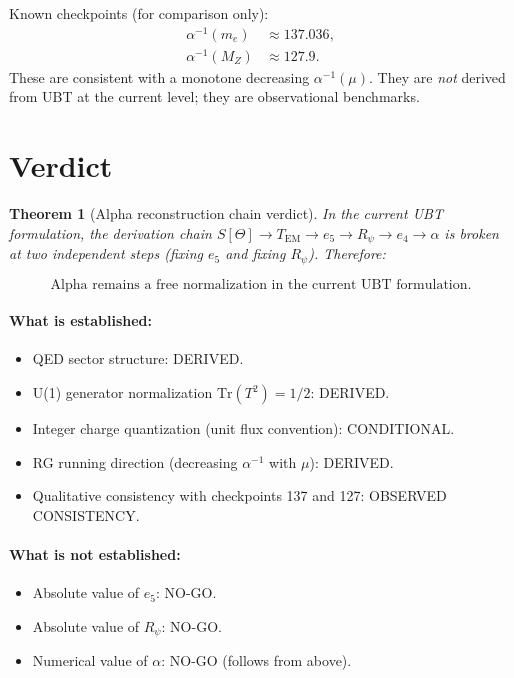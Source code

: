 \documentclass[11pt,a4paper]{article}
\newtheorem{theorem}[proposition]{Theorem}
\begin{document}
Known checkpoints (for comparison only):
\begin{align}
  \alpha^{-1}(m_e)&\approx 137.036,\\
  \alpha^{-1}(M_Z)&\approx 127.9.
\end{align}
These are consistent with a monotone decreasing $\alpha^{-1}(\mu)$.
They are \emph{not} derived from UBT at the current level; they are
observational benchmarks.

\section{Verdict}

\begin{theorem}[Alpha reconstruction chain verdict]
In the current UBT formulation, the derivation chain
$S[\Theta]\to T_\mathrm{EM}\to e_5\to R_\psi\to e_4\to\alpha$
is broken at two independent steps (fixing $e_5$ and fixing $R_\psi$).
Therefore:

\[\boxed{\text{Alpha remains a free normalization in the current UBT formulation.}}\]
\end{theorem}

\paragraph{What is established:}
\begin{itemize}
  \item QED sector structure: DERIVED.
  \item U(1) generator normalization $\mathrm{Tr}(T^2)=1/2$: DERIVED.
  \item Integer charge quantization (unit flux convention): CONDITIONAL.
  \item RG running direction (decreasing $\alpha^{-1}$ with $\mu$): DERIVED.
  \item Qualitative consistency with checkpoints 137 and 127: OBSERVED CONSISTENCY.
\end{itemize}

\paragraph{What is not established:}
\begin{itemize}
  \item Absolute value of $e_5$: NO-GO.
  \item Absolute value of $R_\psi$: NO-GO.
  \item Numerical value of $\alpha$: NO-GO (follows from above).
\end{itemize}
\end{document}
